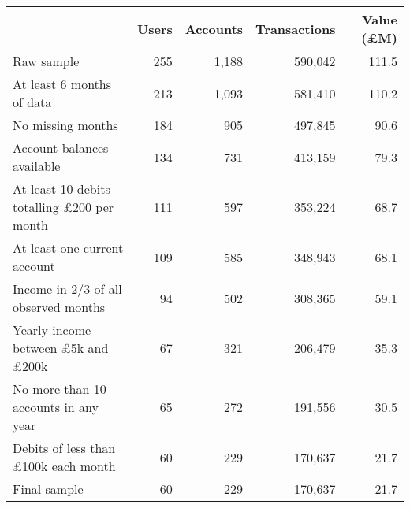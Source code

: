 \begin{tabular}{lrrrr}
\toprule
                                                  & Users & Accounts & Transactions & Value (\pounds M) \\
\midrule
                                       Raw sample &   255 &    1,188 &      590,042 &             111.5 \\
                        At least 6 months of data &   213 &    1,093 &      581,410 &             110.2 \\
                                No missing months &   184 &      905 &      497,845 &              90.6 \\
                       Account balances available &   134 &      731 &      413,159 &              79.3 \\
At least 10 debits totalling \pounds200 per month &   111 &      597 &      353,224 &              68.7 \\
                     At least one current account &   109 &      585 &      348,943 &              68.1 \\
             Income in 2/3 of all observed months &    94 &      502 &      308,365 &              59.1 \\
  Yearly income between \pounds5k and \pounds200k &    67 &      321 &      206,479 &              35.3 \\
             No more than 10 accounts in any year &    65 &      272 &      191,556 &              30.5 \\
       Debits of less than \pounds100k each month &    60 &      229 &      170,637 &              21.7 \\
                                     Final sample &    60 &      229 &      170,637 &              21.7 \\
\bottomrule
\end{tabular}
